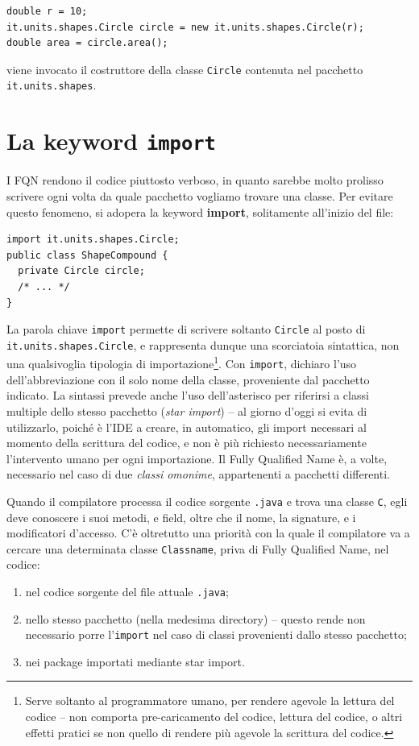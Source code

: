 \documentclass[\fontsizeclass,twocolumn]{\classname}
\let\oldtextsc\textsc
\renewcommand{\textsc}[1]{\oldtextsc{\scfontfs #1}}
\theoremstyle{definition}
\theoremstyle{definition}
\begin{document}
\begin{lstlisting}
double r = 10;
it.units.shapes.Circle circle = new it.units.shapes.Circle(r);
double area = circle.area();
\end{lstlisting}

viene invocato il costruttore della classe \texttt{Circle} contenuta nel
pacchetto \texttt{it.units.shapes}.

\section{La keyword \texttt{import}}

I FQN rendono il codice piuttosto verboso, in quanto sarebbe molto prolisso
scrivere ogni volta da quale pacchetto vogliamo trovare una classe. Per evitare
questo fenomeno, si adopera la keyword \textbf{import}, solitamente all'inizio
del file:

\begin{lstlisting}
import it.units.shapes.Circle;
public class ShapeCompound {
  private Circle circle;
  /* ... */
}
\end{lstlisting}

La parola chiave \texttt{import} permette di scrivere soltanto \texttt{Circle}
al posto di \texttt{it.units.shapes.Circle}, e rappresenta dunque una
scorciatoia sintattica, non una qualsivoglia tipologia di
importazione\footnote{Serve soltanto al programmatore umano, per rendere
agevole la lettura del codice \--- non comporta pre-caricamento del
codice, lettura del codice, o altri effetti pratici se non quello di rendere
più agevole la scrittura del codice.}. Con \texttt{import}, dichiaro l'uso
dell'abbreviazione con il solo nome della classe, proveniente dal pacchetto
indicato. La sintassi prevede anche l'uso dell'asterisco per riferirsi a classi
multiple dello stesso pacchetto (\emph{star import}) \--- al giorno d'oggi si
evita di utilizzarlo, poiché è l'\textsc{IDE} a creare, in automatico, gli import
necessari al momento della scrittura del codice, e non è più richiesto
necessariamente l'intervento umano per ogni importazione. Il Fully Qualified
Name è, a volte, necessario nel caso di due \emph{classi omonime}, appartenenti
a pacchetti differenti.

Quando il compilatore processa il codice sorgente \texttt{.java} e trova una
classe \texttt{C}, egli deve conoscere i suoi metodi, e field, oltre che il
nome, la signature, e i modificatori d'accesso. C'è oltretutto una priorità con
la quale il compilatore va a cercare una determinata classe \texttt{Classname},
priva di Fully Qualified Name, nel codice:
\begin{enumerate}
    \item nel codice sorgente del file attuale \texttt{.java};
    \item nello stesso pacchetto (nella medesima directory) \--- questo rende
        non necessario porre l'\texttt{import} nel caso di classi provenienti
        dallo stesso pacchetto;
    \item nei package importati mediante star import.
\end{enumerate}
\end{document}
